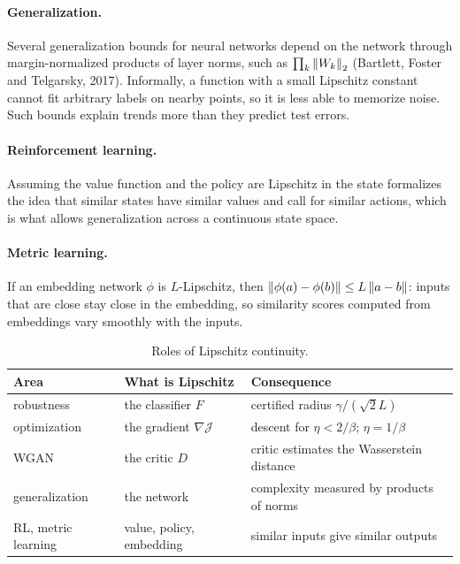 \begin{notechapter}
\paragraph{Generalization.} Several generalization bounds for neural networks
depend on the network through margin-normalized products of layer norms, such
as $\prod_k\left\|W_k\right\|_2$ (Bartlett, Foster and Telgarsky, 2017). Informally, a
function with a small Lipschitz constant cannot fit arbitrary labels on nearby
points, so it is less able to memorize noise. Such bounds explain trends more
than they predict test errors.

\paragraph{Reinforcement learning.} Assuming the value function and the policy
are Lipschitz in the state formalizes the idea that similar states have
similar values and call for similar actions, which is what allows
generalization across a continuous state space.

\paragraph{Metric learning.} If an embedding network $\phi$ is $L$-Lipschitz,
then $\left\|\phi(a) - \phi(b)\right\|\leq L\left\|a-b\right\|$: inputs that are close stay
close in the embedding, so similarity scores computed from embeddings vary
smoothly with the inputs.

\begin{table}[ht]
\centering
\caption{Roles of Lipschitz continuity.}
\label{lipschitz-continuity:tab:summary}
\begin{tabular}{@{}p{}p{}p{}@{}}
\toprule
Area & What is Lipschitz & Consequence \\
\midrule
robustness & the classifier $F$ & certified radius $\gamma/(\sqrt2L)$ \\
optimization & the gradient $\nabla\mathcal J$ & descent for $\eta<2/\beta$; $\eta = 1/\beta$ \\
WGAN & the critic $D$ & critic estimates the Wasserstein distance \\
generalization & the network & complexity measured by products of norms \\
RL, metric learning & value, policy, embedding & similar inputs give similar outputs \\
\bottomrule
\end{tabular}
\end{table}


\end{notechapter}
